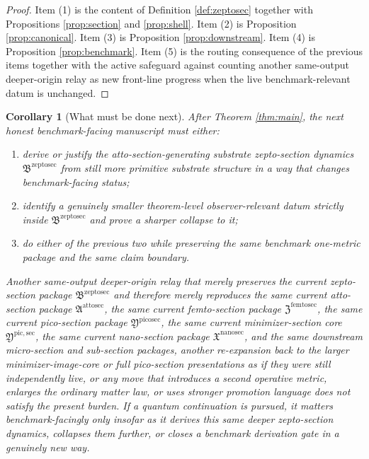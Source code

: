 \documentclass[11pt]{article}
\newcommand{\NanoSectionPackage}{\mathfrak X^{\mathrm{nanosec}}}
\newcommand{\PicoSectionPackage}{\mathfrak Y^{\mathrm{picosec}}}
\newcommand{\PicoMinSectionCore}{\mathfrak Y^{\mathrm{pic,sec}}}
\newcommand{\FemtoSectionPackage}{\mathfrak Z^{\mathrm{femtosec}}}
\newcommand{\AttoSectionPackage}{\mathfrak A^{\mathrm{attosec}}}
\newcommand{\ZeptoSectionPackage}{\mathfrak B^{\mathrm{zeptosec}}}
\newtheorem{corollary}{Corollary}
\begin{document}
\begin{proof}
Item (1) is the content of Definition \ref{def:zeptosec} together with Propositions \ref{prop:section} and \ref{prop:shell}. Item (2) is Proposition \ref{prop:canonical}. Item (3) is Proposition \ref{prop:downstream}. Item (4) is Proposition \ref{prop:benchmark}. Item (5) is the routing consequence of the previous items together with the active safeguard against counting another same-output deeper-origin relay as new front-line progress when the live benchmark-relevant datum is unchanged.
\end{proof}

\begin{corollary}[What must be done next]
\label{cor:next}
After Theorem \ref{thm:main}, the next honest benchmark-facing manuscript must either:
\begin{enumerate}
    \item derive or justify the atto-section-generating substrate zepto-section dynamics \(\ZeptoSectionPackage\) from still more primitive substrate structure in a way that changes benchmark-facing status;
    \item identify a genuinely smaller theorem-level observer-relevant datum strictly inside \(\ZeptoSectionPackage\) and prove a sharper collapse to it;
    \item do either of the previous two while preserving the same benchmark one-metric package and the same claim boundary.
\end{enumerate}
Another same-output deeper-origin relay that merely preserves the current zepto-section package \(\ZeptoSectionPackage\) and therefore merely reproduces the same current atto-section package \(\AttoSectionPackage\), the same current femto-section package \(\FemtoSectionPackage\), the same current pico-section package \(\PicoSectionPackage\), the same current minimizer-section core \(\PicoMinSectionCore\), the same current nano-section package \(\NanoSectionPackage\), and the same downstream micro-section and sub-section packages, another re-expansion back to the larger minimizer-image-core or full pico-section presentations as if they were still independently live, or any move that introduces a second operative metric, enlarges the ordinary matter law, or uses stronger promotion language does not satisfy the present burden. If a quantum continuation is pursued, it matters benchmark-facingly only insofar as it derives this same deeper zepto-section dynamics, collapses them further, or closes a benchmark derivation gate in a genuinely new way.
\end{corollary}
\end{document}
